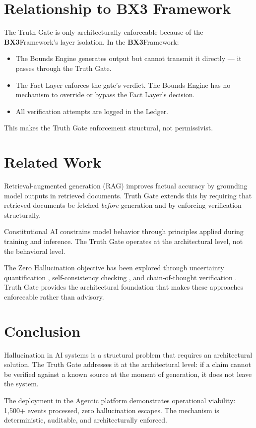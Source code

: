 \documentclass[12pt]{article}
\newcommand{\bxthree}{\textbf{BX3}}
\begin{document}
\section{Relationship to BX3 Framework}
\label{sec:relationship}

The Truth Gate is only architecturally enforceable because of the \bxthree Framework's layer isolation. In the \bxthree Framework:

\begin{itemize}[noitemsep]
    \item The Bounds Engine generates output but cannot transmit it directly --- it passes through the Truth Gate.
    \item The Fact Layer enforces the gate's verdict. The Bounds Engine has no mechanism to override or bypass the Fact Layer's decision.
    \item All verification attempts are logged in the Ledger.
\end{itemize}

This makes the Truth Gate enforcement structural, not permissivist.

\section{Related Work}
\label{sec:prior}

Retrieval-augmented generation (RAG) \cite{lewis2020rag} improves factual accuracy by grounding model outputs in retrieved documents. Truth Gate extends this by requiring that retrieved documents be fetched \textit{before} generation and by enforcing verification structurally.

Constitutional AI \cite{anthropic2022cai} constrains model behavior through principles applied during training and inference. The Truth Gate operates at the architectural level, not the behavioral level.

The Zero Hallucination objective has been explored through uncertainty quantification \cite{kadra2021}, self-consistency checking \cite{wang2022self}, and chain-of-thought verification \cite{stein2021}. Truth Gate provides the architectural foundation that makes these approaches enforceable rather than advisory.

\section{Conclusion}
\label{sec:conclusion}

Hallucination in AI systems is a structural problem that requires an architectural solution. The Truth Gate addresses it at the architectural level: if a claim cannot be verified against a known source at the moment of generation, it does not leave the system.

The deployment in the Agentic platform demonstrates operational viability: 1,500+ events processed, zero hallucination escapes. The mechanism is deterministic, auditable, and architecturally enforced.



\end{document}
